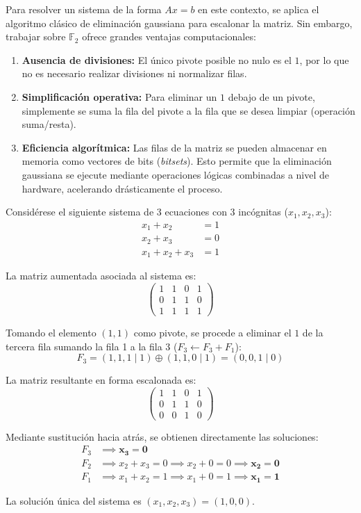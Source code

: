 Para resolver un sistema de la forma $Ax = b$ en este contexto, se aplica el algoritmo clásico de eliminación gaussiana para escalonar la matriz. Sin embargo, trabajar sobre $\mathbb{F}_2$ ofrece grandes ventajas computacionales:
\begin{enumerate}
    \item \textbf{Ausencia de divisiones:} El único pivote posible no nulo es el $1$, por lo que no es necesario realizar divisiones ni normalizar filas.
    \item \textbf{Simplificación operativa:} Para eliminar un $1$ debajo de un pivote, simplemente se suma la fila del pivote a la fila que se desea limpiar (operación suma/resta).
    \item \textbf{Eficiencia algorítmica:} Las filas de la matriz se pueden almacenar en memoria como vectores de bits (\textit{bitsets}). Esto permite que la eliminación gaussiana se ejecute mediante operaciones lógicas combinadas a nivel de hardware, acelerando drásticamente el proceso.
\end{enumerate}

\begin{ejemplo}

Considérese el siguiente sistema de 3 ecuaciones con 3 incógnitas ($x_1, x_2, x_3$):
\begin{align*}
    x_1 + x_2 &= 1 \\
    x_2 + x_3 &= 0 \\
    x_1 + x_2 + x_3 &= 1
\end{align*}

La matriz aumentada asociada al sistema es:
\[
\left(\begin{array}{ccc|c}
1 & 1 & 0 & 1 \\
0 & 1 & 1 & 0 \\
1 & 1 & 1 & 1
\end{array}\right)
\]

Tomando el elemento $(1,1)$ como pivote, se procede a eliminar el $1$ de la tercera fila sumando la fila 1 a la fila 3 ($F_3 \leftarrow F_3 + F_1$):
\[
F_3 = (1, 1, 1 \mid 1) \oplus (1, 1, 0 \mid 1) = (0, 0, 1 \mid 0)
\]

La matriz resultante en forma escalonada es:
\[
\left(\begin{array}{ccc|c}
1 & 1 & 0 & 1 \\
0 & 1 & 1 & 0 \\
0 & 0 & 1 & 0
\end{array}\right)
\]

Mediante sustitución hacia atrás, se obtienen directamente las soluciones:
\begin{align*}
    F_3 &\implies \mathbf{x_3 = 0} \\
    F_2 &\implies x_2 + x_3 = 0 \implies x_2 + 0 = 0 \implies \mathbf{x_2 = 0} \\
    F_1 &\implies x_1 + x_2 = 1 \implies x_1 + 0 = 1 \implies \mathbf{x_1 = 1}
\end{align*}

La solución única del sistema es $(x_1, x_2, x_3) = (1, 0, 0)$.
\end{ejemplo}

